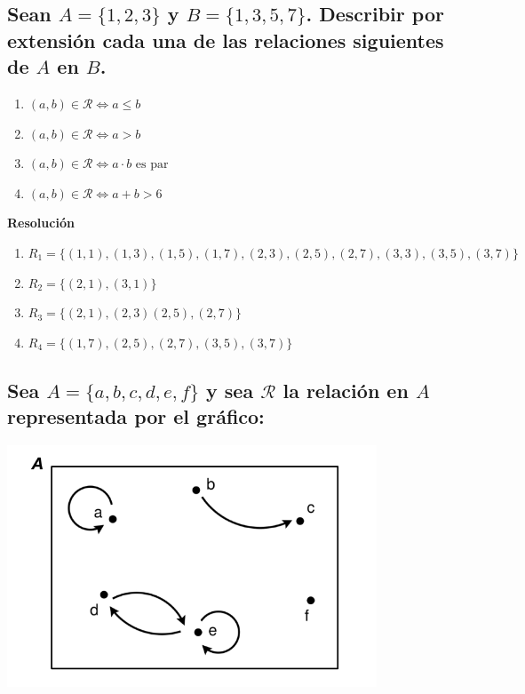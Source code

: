 \documentclass[11pt]{article}
\begin{document}
\subsection{Sean $A = \{1,2,3\}$ y $B = \{1,3,5,7\}$. Describir por extensión cada una de las relaciones siguientes de $A$ en $B$.}

\begin{enumerate}[label=\roman*)]
    \item $(a,b) \in \mathcal{R} \iff a \leq b$
    \item $(a,b) \in \mathcal{R} \iff a > b$
    \item $(a,b) \in \mathcal{R} \iff a \cdot b \text{ es par}$
    \item $(a,b) \in \mathcal{R} \iff a + b > 6$
\end{enumerate}

\textbf{Resolución}
\begin{enumerate}[label=\roman*)]
    \item $ R_{1} =  \{(1,1), (1, 3), (1, 5), (1, 7), (2, 3), (2, 5), (2, 7), (3, 3), (3, 5), (3, 7)\}$
    \item $ R_{2} = \{ (2,1 ), (3,1)\}$
    \item $ R_{3} = \{(2,1), (2,3) (2, 5), (2, 7)\}$
    \item $ R_{4} = \{(1, 7), (2,5), (2, 7), (3,5), (3,7)\} $
\end{enumerate}

\subsection{Sea $A = \{a, b, c, d, e, f\}$ y sea $\mathcal{R}$ la relación en $A$ representada por el gráfico:}

\begin{center}
    \includegraphics[scale=1]{ejercicio21.png}
\end{center}
\end{document}

